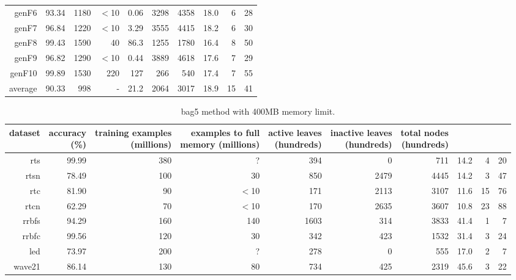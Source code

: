\begin{table}
\begin{tabular}{|r|r|r|r|r|r|r|r|r|r|}
{\sc genF6} & 93.34 & 1180 & $<$10 & 0.06 & 3298 & 4358 & 18.0 & 6 & 28 \\
{\sc genF7} & 96.84 & 1220 & $<$10 & 3.29 & 3555 & 4415 & 18.2 & 6 & 30 \\
{\sc genF8} & 99.43 & 1590 & 40 & 86.3 & 1255 & 1780 & 16.4 & 8 & 50 \\
{\sc genF9} & 96.82 & 1290 & $<$10 & 0.44 & 3889 & 4618 & 17.6 & 7 & 29 \\
{\sc genF10} & 99.89 & 1530 & 220 & 127 & 266 & 540 & 17.4 & 7 & 55 \\
\hline
average & 90.33 & 998 &  -  & 21.2 & 2064 & 3017 & 18.9 & 15 & 41 \\
\hline
\end{tabular}
\end{table}
\clearpage
\begin{table}
\caption{{\sc bag5} method with 400MB memory limit.}
\label{tab:bag5-400MB}
\centering
\begin{tabular}{|r|r|r|r|r|r|r|r|r|r|}
\hline
dataset	&
\rotatebox{90}{\parbox{9em}{accuracy\\(\%)}} &
\rotatebox{90}{\parbox{9em}{training examples\\(millions)}} &
\rotatebox{90}{\parbox{9em}{examples to full\\memory (millions)}} &
\rotatebox{90}{\parbox{9em}{active leaves\\(hundreds)}} &
\rotatebox{90}{\parbox{9em}{inactive leaves\\(hundreds)}} &
\rotatebox{90}{\parbox{9em}{total nodes\\(hundreds)}} &
\rotatebox{90}{\parbox{9em}{average tree depth}}	&
\rotatebox{90}{\parbox{9em}{training speed (\%)}} &
\rotatebox{90}{\parbox{9em}{prediction speed (\%)}} \\
\hline
{\sc rts} & 99.99 & 380 & ? & 394 & 0 & 711 & 14.2 & 4 & 20 \\
{\sc rtsn} & 78.49 & 100 & 30 & 850 & 2479 & 4445 & 14.2 & 3 & 47 \\
{\sc rtc} & 81.90 & 90 & $<$10 & 171 & 2113 & 3107 & 11.6 & 15 & 76 \\
{\sc rtcn} & 62.29 & 70 & $<$10 & 170 & 2635 & 3607 & 10.8 & 23 & 88 \\
{\sc rrbfs} & 94.29 & 160 & 140 & 1603 & 314 & 3833 & 41.4 & 1 & 7 \\
{\sc rrbfc} & 99.56 & 120 & 30 & 342 & 423 & 1532 & 31.4 & 3 & 24 \\
{\sc led} & 73.97 & 200 & ? & 278 & 0 & 555 & 17.0 & 2 & 7 \\
{\sc wave21} & 86.14 & 130 & 80 & 734 & 425 & 2319 & 45.6 & 3 & 22 \\

\end{tabular}
\end{table}
